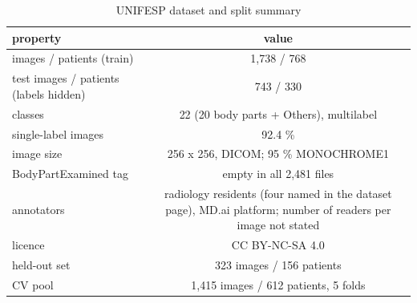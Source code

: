 \setcounter{table}{8}
\begin{table}[!ht]\centering\small
\caption{UNIFESP dataset and split summary}\label{tab:dataset}
\begin{tabular}{p{}c}
\toprule
\textbf{property} & \textbf{value} \\
\midrule
images / patients (train) & 1,738 / 768 \\
test images / patients (labels hidden) & 743 / 330 \\
classes & 22 (20 body parts + Others), multilabel \\
single-label images & 92.4 \% \\
image size & 256 x 256, DICOM; 95 \% MONOCHROME1 \\
BodyPartExamined tag & empty in all 2,481 files \\
annotators & radiology residents (four named in the dataset page), MD.ai platform; number of readers per image not stated \\
licence & CC BY-NC-SA 4.0 \\
held-out set & 323 images / 156 patients \\
CV pool & 1,415 images / 612 patients, 5 folds \\
\bottomrule
\end{tabular}
\par{}
\end{table}
